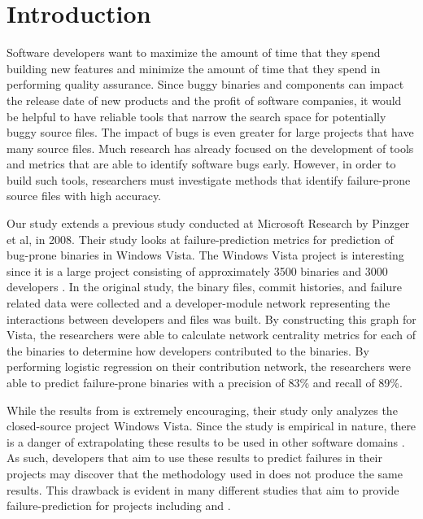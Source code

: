 \documentclass{sig-alternate-05-2015}
\begin{document}
\section{Introduction}
Software developers want to maximize the amount of time that they spend building new features and minimize the amount of time that they spend in performing quality assurance. Since buggy binaries and components can impact the release date of new products and the profit of software companies, it would be helpful to have reliable tools that narrow the search space for potentially buggy source files. The impact of bugs is even greater for large projects that have many source files. Much research has already focused on the development of tools and metrics that are able to identify software bugs early. However, in order to build such tools, researchers must investigate methods that identify failure-prone source files with high accuracy. 

Our study extends a previous study conducted at Microsoft Research by Pinzger et al, \cite{pingzer:networks} in 2008. Their study looks at failure-prediction metrics for prediction of bug-prone binaries in Windows Vista. The Windows Vista project is interesting since it is a large project consisting of approximately 3500 binaries and 3000 developers \cite{Bird:Distributed}. In the original study, the binary files, commit histories, and failure related data were collected and a developer-module network representing the interactions between developers and files was built. By constructing this graph for Vista, the researchers were able to calculate network centrality metrics for each of the binaries to determine how developers contributed to the binaries. By performing logistic regression on their contribution network, the researchers were able to predict failure-prone binaries with a precision of 83\% and recall of 89\%.

While the results from \cite{pingzer:networks} is extremely encouraging, their study only analyzes the closed-source project Windows Vista. Since the study is empirical in nature, there is a danger of extrapolating these results to be used in other software domains \cite{oram:software}. As such, developers that aim to use these results to predict failures in their projects may discover that the methodology used in \cite{pingzer:networks} does not produce the same results. This drawback is evident in many different studies that aim to provide failure-prediction for projects including \cite{Bird:Distributed} and \cite{Nag:Failures}.
\end{document}
